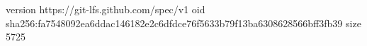 version https://git-lfs.github.com/spec/v1
oid sha256:fa7548092ea6ddac146182e2c6dfdce76f5633b79f13ba6308628566bff3fb39
size 5725
